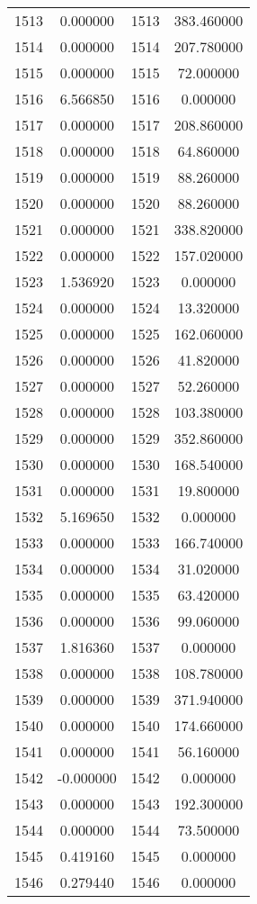 \documentclass[12pt]{article}
\begin{document}
\begin{longtable}{@{}cccc@{}}
1513 & 0.000000 & 1513 & 383.460000 \\
1514 & 0.000000 & 1514 & 207.780000 \\
1515 & 0.000000 & 1515 & 72.000000 \\
1516 & 6.566850 & 1516 & 0.000000 \\
1517 & 0.000000 & 1517 & 208.860000 \\
1518 & 0.000000 & 1518 & 64.860000 \\
1519 & 0.000000 & 1519 & 88.260000 \\
1520 & 0.000000 & 1520 & 88.260000 \\
1521 & 0.000000 & 1521 & 338.820000 \\
1522 & 0.000000 & 1522 & 157.020000 \\
1523 & 1.536920 & 1523 & 0.000000 \\
1524 & 0.000000 & 1524 & 13.320000 \\
1525 & 0.000000 & 1525 & 162.060000 \\
1526 & 0.000000 & 1526 & 41.820000 \\
1527 & 0.000000 & 1527 & 52.260000 \\
1528 & 0.000000 & 1528 & 103.380000 \\
1529 & 0.000000 & 1529 & 352.860000 \\
1530 & 0.000000 & 1530 & 168.540000 \\
1531 & 0.000000 & 1531 & 19.800000 \\
1532 & 5.169650 & 1532 & 0.000000 \\
1533 & 0.000000 & 1533 & 166.740000 \\
1534 & 0.000000 & 1534 & 31.020000 \\
1535 & 0.000000 & 1535 & 63.420000 \\
1536 & 0.000000 & 1536 & 99.060000 \\
1537 & 1.816360 & 1537 & 0.000000 \\
1538 & 0.000000 & 1538 & 108.780000 \\
1539 & 0.000000 & 1539 & 371.940000 \\
1540 & 0.000000 & 1540 & 174.660000 \\
1541 & 0.000000 & 1541 & 56.160000 \\
1542 & -0.000000 & 1542 & 0.000000 \\
1543 & 0.000000 & 1543 & 192.300000 \\
1544 & 0.000000 & 1544 & 73.500000 \\
1545 & 0.419160 & 1545 & 0.000000 \\
1546 & 0.279440 & 1546 & 0.000000 \\

\end{longtable}
\end{document}
